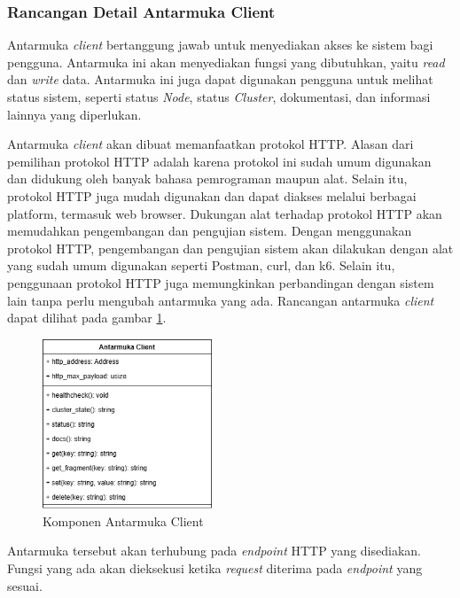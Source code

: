 \subsubsection{Rancangan Detail Antarmuka Client}
\label{subsubsection:detail-client-interface}

Antarmuka \textit{client} bertanggung jawab untuk menyediakan akses ke sistem bagi pengguna. Antarmuka ini akan menyediakan fungsi yang dibutuhkan, yaitu \textit{read} dan \textit{write} data. Antarmuka ini juga dapat digunakan pengguna untuk melihat status sistem, seperti status \textit{Node}, status \textit{Cluster}, dokumentasi, dan informasi lainnya yang diperlukan.

Antarmuka \textit{client} akan dibuat memanfaatkan protokol HTTP. Alasan dari pemilihan protokol HTTP adalah karena protokol ini sudah umum digunakan dan didukung oleh banyak bahasa pemrograman maupun alat. Selain itu, protokol HTTP juga mudah digunakan dan dapat diakses melalui berbagai platform, termasuk web browser. Dukungan alat terhadap protokol HTTP akan memudahkan pengembangan dan pengujian sistem. Dengan menggunakan protokol HTTP, pengembangan dan pengujian sistem akan dilakukan dengan alat yang sudah umum digunakan seperti Postman, curl, dan k6. Selain itu, penggunaan protokol HTTP juga memungkinkan perbandingan dengan sistem lain tanpa perlu mengubah antarmuka yang ada. Rancangan antarmuka \textit{client} dapat dilihat pada gambar \ref{fig:client-interface-component}.

\begin{figure}[ht]
    \centering
    \includegraphics[width=0.45\textwidth]{resources/chapter-3/client-interface-component.png}
    \caption{Komponen Antarmuka Client}
    \label{fig:client-interface-component}
\end{figure}

Antarmuka tersebut akan terhubung pada \textit{endpoint} HTTP yang disediakan. Fungsi yang ada akan dieksekusi ketika \textit{request} diterima pada \textit{endpoint} yang sesuai.